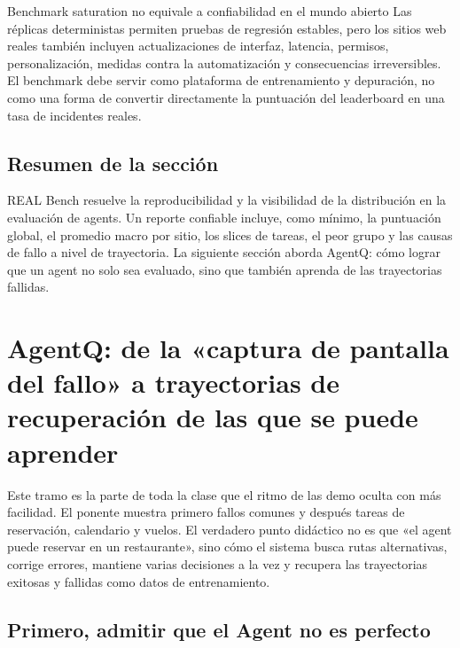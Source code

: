 \documentclass[a4paper]{article}
\begin{document}
\begin{warningbox}{Benchmark saturation no equivale a confiabilidad en el mundo abierto}
Las réplicas deterministas permiten pruebas de regresión estables, pero los sitios web reales también incluyen actualizaciones de interfaz, latencia, permisos, personalización, medidas contra la automatización y consecuencias irreversibles. El benchmark debe servir como plataforma de entrenamiento y depuración, no como una forma de convertir directamente la puntuación del leaderboard en una tasa de incidentes reales.
\end{warningbox}


\subsection{Resumen de la sección}

REAL Bench resuelve la reproducibilidad y la visibilidad de la distribución en la evaluación de agents. Un reporte confiable incluye, como mínimo, la puntuación global, el promedio macro por sitio, los slices de tareas, el peor grupo y las causas de fallo a nivel de trayectoria. La siguiente sección aborda AgentQ: cómo lograr que un agent no solo sea evaluado, sino que también aprenda de las trayectorias fallidas.
\section{AgentQ: de la «captura de pantalla del fallo» a trayectorias de recuperación de las que se puede aprender}

Este tramo es la parte de toda la clase que el ritmo de las demo oculta con más facilidad. El ponente muestra primero fallos comunes y después tareas de reservación, calendario y vuelos. El verdadero punto didáctico no es que «el agent puede reservar en un restaurante», sino cómo el sistema busca rutas alternativas, corrige errores, mantiene varias decisiones a la vez y recupera las trayectorias exitosas y fallidas como datos de entrenamiento.

\subsection{Primero, admitir que el Agent no es perfecto}
\end{document}

